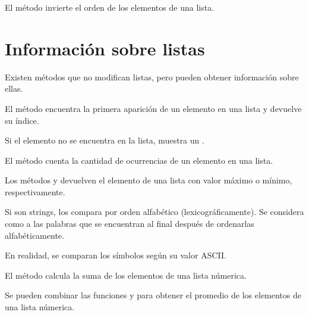 
El método  invierte el orden de los elementos de una lista.
  

\section{Información sobre listas}

Existen métodos que no modifican listas, pero pueden obtener información sobre ellas.

El método  encuentra la primera aparición de un elemento en una lista y devuelve su índice.
  

Si el elemento no se encuentra en la lista, muestra un .


El método  cuenta la cantidad de ocurrencias de un elemento en una lista.
  

Los métodos  y  devuelven el elemento de una lista con valor máximo o mínimo, respectivamente.


Si son strings, los compara por orden alfabético (lexicográficamente). Se considera como  a las palabras que se encuentran al final después de ordenarlas alfabéticamente.


En realidad, se comparan los símbolos según su valor ASCII.

El método  calcula la suma de los elementos de una lista númerica.
  

Se pueden combinar las funciones  y  para obtener el promedio de los elementos de una lista númerica.


